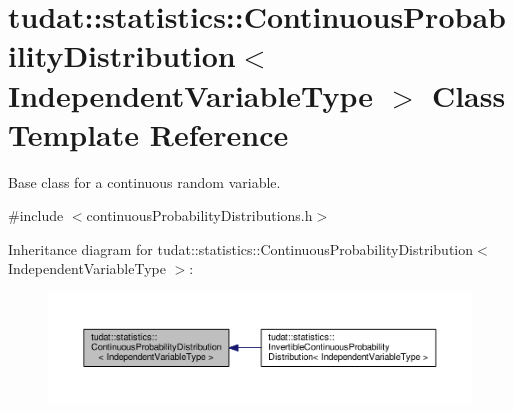 \hypertarget{classtudat_1_1statistics_1_1ContinuousProbabilityDistribution}{}\section{tudat\+:\+:statistics\+:\+:Continuous\+Probability\+Distribution$<$ Independent\+Variable\+Type $>$ Class Template Reference}
\label{classtudat_1_1statistics_1_1ContinuousProbabilityDistribution}


Base class for a continuous random variable.  




{\ttfamily \#include $<$continuous\+Probability\+Distributions.\+h$>$}



Inheritance diagram for tudat\+:\+:statistics\+:\+:Continuous\+Probability\+Distribution$<$ Independent\+Variable\+Type $>$\+:
\nopagebreak
\begin{figure}[H]
\begin{center}
\leavevmode
\includegraphics[width=350pt]{classtudat_1_1statistics_1_1ContinuousProbabilityDistribution__inherit__graph}
\end{center}
\end{figure}
